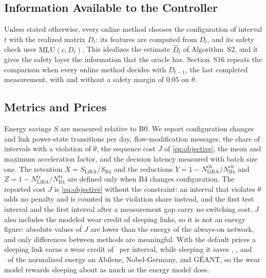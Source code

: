 \documentclass[5p,times]{elsarticle}
\begin{document}
\subsection{Information Available to the Controller}\label{sec:protocol}

Unless stated otherwise, every online method chooses the configuration of interval $t$ with the realized matrix $D_t$: its features are computed from $D_t$, and its safety check uses $\mathrm{MLU}(c,D_t)$. This idealizes the estimate $\hat D_t$ of Algorithm~S2, and it gives the safety layer the information that the oracle has. Section~S16 repeats the comparison when every online method decides with $D_{t-1}$, the last completed measurement, with and without a safety margin of $0.05$ on $\theta$.

\subsection{Metrics and Prices}

Energy savings $S$ are measured relative to B0. We report configuration changes and link power-state transitions per day, flow-modification messages, the share of intervals with a violation of $\theta$, the sequence cost $J$ of \eqref{eq:objective}, the mean and maximum acceleration factor, and the decision latency measured with batch size one. The retention $X=S_{\mathrm{LiRA}}/S_{\mathrm{B4}}$ and the reductions $Y=1-N^{\mathrm{ch}}_{\mathrm{LiRA}}/N^{\mathrm{ch}}_{\mathrm{B4}}$ and $Z=1-N^{\mathrm{tr}}_{\mathrm{LiRA}}/N^{\mathrm{tr}}_{\mathrm{B4}}$ are defined only when B4 changes configuration. The reported cost $J$ is \eqref{eq:objective} without the constraint: an interval that violates $\theta$ adds no penalty and is counted in the violation share instead, and the first test interval and the first interval after a measurement gap carry no switching cost. $J$ also includes the modeled wear credit of sleeping links, so it is not an energy figure: absolute values of $J$ are lower than the energy of the always-on network, and only differences between methods are meaningful. With the default prices a sleeping link earns a wear credit of \wearCredit\ per interval, while sleeping it saves \sleepSaveabi, \sleepSavenob, and \sleepSavegea\ of the normalized energy on Abilene, Nobel-Germany, and G\'{E}ANT, so the wear model rewards sleeping about as much as the energy model does.
\end{document}
